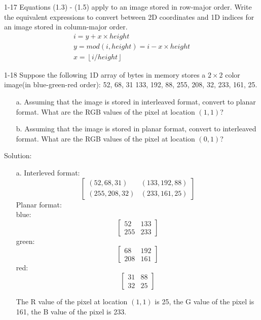 \documentclass[a4paper]{article}
\begin{document}
\begin{spacing}{2.0}
	1-17 Equations (1.3) - (1.5) apply to an image stored in row-major order. Write the equivalent expressions to convert between 2D coordinates and 1D indices for an image stored in column-major order.\\ 
	 \begin{align}
	 i = y + x \times height \tag{1.3'}\\
         y = mod(i, height) = i - x \times height \tag{1.4'}\\
         x = \left\lfloor i/height \right \rfloor \tag{1.5'}
	 \end{align}
	
	
	1-18 Suppose the following 1D array of bytes in memory stores a $2\times 2$ color image(in blue-green-red order): 52, 68, 31 133, 192, 88, 255, 208, 32, 233, 161, 25. 
	\begin{enumerate}
	\item[a.] Assuming that the image is stored in interleaved format, convert to planar format. What are the RGB values of the pixel at location $(1, 1)$?
	\item[b.] Assuming that the image is stored in planar format, convert to interleaved format. What are the RGB values of the pixel at location $(0, 1)$?
	\end{enumerate}
	Solution:
	\begin{enumerate}
	\item[a. ] 
	Interleved format:
	 $$\left [ \begin{matrix}
	(52, 68, 31) & (133, 192, 88)\\
	(255, 208, 32) & (233, 161, 25)
	\end{matrix} \right ]$$
	Planar format:\\
	blue:
	$$\left [ \begin{matrix}
	52 & 133 \\
	255 & 233
	\end{matrix} \right ]$$
	green:
	$$\left [ \begin{matrix}
	68 & 192 \\
	208 & 161
	\end{matrix} \right ]$$
	red:
	$$\left [ \begin{matrix}
	31 & 88 \\
	32 & 25
	\end{matrix} \right ]$$
	

	The R value of the pixel at location $(1,1)$ is 25, the G value of the pixel is 161, the B value of the pixel is 233.\\
						

\end{enumerate}
\end{spacing}
\end{document}

